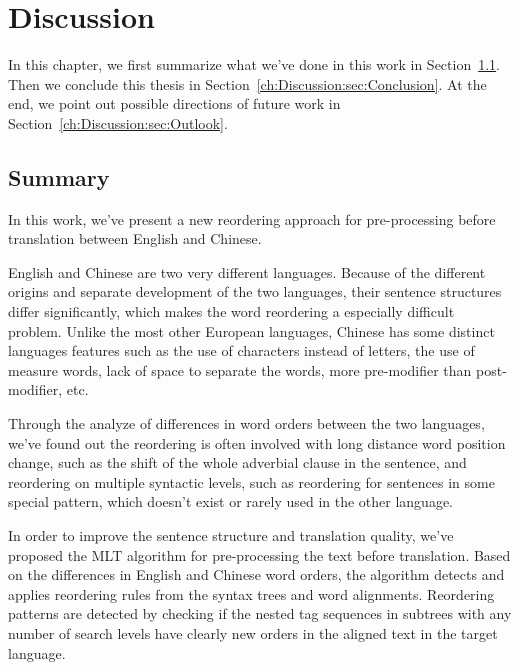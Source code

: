 

\chapter{Discussion}
\label{ch:Discussion}

In this chapter, we first summarize what we've done in this work in Section~\ref{ch:Discussion:sec:Summary}. Then we conclude this thesis in Section~\ref{ch:Discussion:sec:Conclusion}. At the end, we point out possible directions of future work in Section~\ref{ch:Discussion:sec:Outlook}.

\section{Summary}
\label{ch:Discussion:sec:Summary}

In this work, we've present a new reordering approach for pre-processing before translation between English and Chinese.

English and Chinese are two very different languages. Because of the different origins and separate development of the two languages, their sentence structures differ significantly, which makes the word reordering a especially difficult problem. Unlike the most other European languages, Chinese has some distinct languages features such as the use of characters instead of letters, the use of measure words, lack of space to separate the words, more pre-modifier than post-modifier, etc.

Through the analyze of differences in word orders between the two languages, we've found out the reordering is often involved with long distance word position change, such as the shift of the whole adverbial clause in the sentence, and reordering on multiple syntactic levels, such as reordering for sentences in some special pattern, which doesn't exist or rarely used in the other language.

In order to improve the sentence structure and translation quality, we've proposed the \acf{MLT} algorithm for pre-processing the text before translation. Based on the differences in English and Chinese word orders, the algorithm detects and applies reordering rules from the syntax trees and word alignments. Reordering patterns are detected by checking if the nested tag sequences in subtrees with any number of search levels have clearly new orders in the aligned text in the target language.

